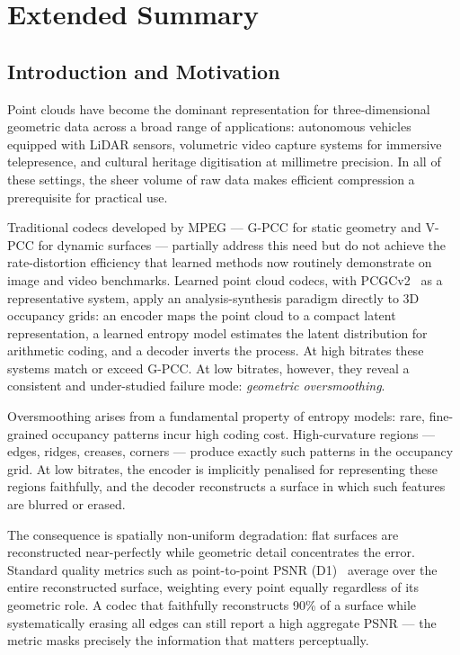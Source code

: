 \chapter*{Extended Summary}

\section*{Introduction and Motivation}

Point clouds have become the dominant representation for three-dimensional
geometric data across a broad range of applications: autonomous vehicles
equipped with LiDAR sensors, volumetric video capture systems for immersive
telepresence, and cultural heritage digitisation at millimetre precision.
In all of these settings, the sheer volume of raw data makes efficient
compression a prerequisite for practical use.

Traditional codecs developed by MPEG --- G-PCC for static geometry and V-PCC
for dynamic surfaces --- partially address this need but do not achieve the
rate-distortion efficiency that learned methods now routinely demonstrate on
image and video benchmarks.
Learned point cloud codecs, with PCGCv2~\cite{wang2021multiscale} as a
representative system, apply an analysis-synthesis paradigm directly to 3D
occupancy grids: an encoder maps the point cloud to a compact latent
representation, a learned entropy model estimates the latent distribution for
arithmetic coding, and a decoder inverts the process.
At high bitrates these systems match or exceed G-PCC.
At low bitrates, however, they reveal a consistent and under-studied failure
mode: \emph{geometric oversmoothing}.

Oversmoothing arises from a fundamental property of entropy models: rare,
fine-grained occupancy patterns incur high coding cost.
High-curvature regions --- edges, ridges, creases, corners --- produce exactly
such patterns in the occupancy grid.
At low bitrates, the encoder is implicitly penalised for representing these
regions faithfully, and the decoder reconstructs a surface in which such
features are blurred or erased.

The consequence is spatially non-uniform degradation: flat surfaces are
reconstructed near-perfectly while geometric detail concentrates the error.
Standard quality metrics such as point-to-point PSNR (D1)~\cite{tian2017geometric}
average over the entire reconstructed surface, weighting every point equally
regardless of its geometric role.
A codec that faithfully reconstructs 90\% of a surface while systematically
erasing all edges can still report a high aggregate PSNR --- the metric masks
precisely the information that matters perceptually.

